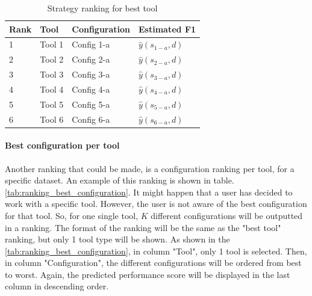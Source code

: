\begin{table}[h]
\centering
\begin{tabular}{|l|l|l|l|}
\hline
\textbf{Rank} & \textbf{Tool} & \textbf{Configuration} & \textbf{Estimated F1} \\ \hline
1             & Tool 1        & Config 1-a             & $\hat{y}(s_{1-a}, d)$ \\ \hline
2             & Tool 2        & Config 2-a             & $\hat{y}(s_{2-a}, d)$ \\ \hline
3             & Tool 3        & Config 3-a             & $\hat{y}(s_{3-a}, d)$ \\ \hline
4             & Tool 4        & Config 4-a             & $\hat{y}(s_{4-a}, d)$ \\ \hline
5             & Tool 5        & Config 5-a             & $\hat{y}(s_{5-a}, d)$ \\ \hline
6             & Tool 6        & Config 6-a             & $\hat{y}(s_{6-a}, d)$ \\ \hline
\end{tabular}
\caption{Strategy ranking for best tool}
\label{tab:ranking_best_tool}
\end{table}

\paragraph{Best configuration per tool} Another ranking that could be made, is a configuration ranking per tool, for a specific dataset. An example of this ranking is shown in table. \autoref{tab:ranking_best_configuration}. It might happen that a user has decided to work with a specific tool. However, the user is not aware of the best configuration for that tool. So, for one single tool, $K$ different configurations will be outputted in a ranking. The format of the ranking will be the same as the "best tool" ranking, but only 1 tool type will be shown. As shown in the \autoref{tab:ranking_best_configuration}, in column "Tool", only 1 tool is selected. Then, in column "Configuration", the different configurations will be ordered from best to worst. Again, the predicted performance score will be displayed in the last column in descending order. 

